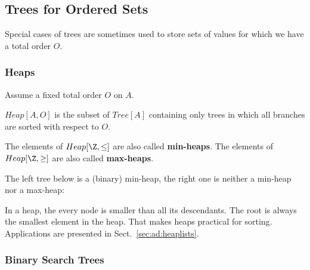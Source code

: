 \subsection{Trees for Ordered Sets}

Special cases of trees are sometimes used to store sets of values for which we have a total order $O$.

\subsubsection{Heaps}\label{sec:ad:heaps}

Assume a fixed total order $O$ on $A$.

\begin{definition}[Heap]
$Heap[A,O]$ is the subset of $Tree[A]$ containing only trees in which all branches are sorted with respect to $O$.
\end{definition}

The elements of $Heap[\Z,\leq]$ are also called \textbf{min-heaps}.
The elements of $Heap[\Z,\geq]$ are also called \textbf{max-heaps}.

The left tree below is a (binary) min-heap, the right one is neither a min-heap nor a max-heap:

\begin{center}
\tb\tb
{}
\end{center}

In a heap, the every node is smaller than all its descendants.
The root is always the smallest element in the heap.
That makes heaps practical for sorting.
Applications are presented in Sect.~\ref{sec:ad:heaplists}.

\subsubsection{Binary Search Trees}

